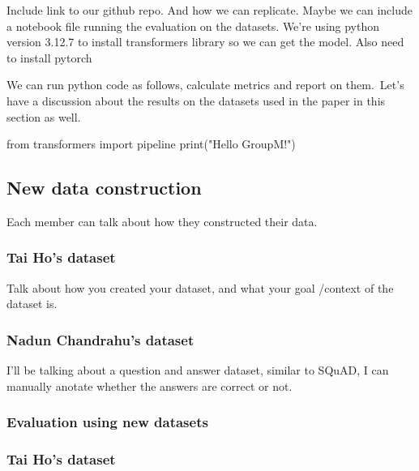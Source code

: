 \documentclass[
  11pt,
]{article}
\newenvironment{Shaded}{\begin{snugshade}}{\end{snugshade}}
\newcommand{\BuiltInTok}[1]{#1}
\newcommand{\ImportTok}[1]{#1}
\newcommand{\NormalTok}[1]{#1}
\newcommand{\StringTok}[1]{\textcolor[rgb]{0.31,0.60,0.02}{#1}}
\begin{document}
Include link to our github repo. And how we can replicate. Maybe we can
include a notebook file running the evaluation on the datasets. We're
using python version 3.12.7 to install transformers library so we can
get the model. Also need to install pytorch

We can run python code as follows, calculate metrics and report on
them.~Let's have a discussion about the results on the datasets used in
the paper in this section as well.

\begin{Shaded}
\begin{Highlighting}[]
\ImportTok{from}\NormalTok{ transformers }\ImportTok{import}\NormalTok{ pipeline}
\BuiltInTok{print}\NormalTok{(}\StringTok{"Hello GroupM!"}\NormalTok{)}
\end{Highlighting}
\end{Shaded}

\subsection{New data construction}\label{new-data-construction}

Each member can talk about how they constructed their data.

\subsubsection{Tai Ho's dataset}\label{tai-hos-dataset}

Talk about how you created your dataset, and what your goal /context of
the dataset is.

\subsubsection{Nadun Chandrahu's
dataset}\label{nadun-chandrahus-dataset}

I'll be talking about a question and answer dataset, similar to SQuAD, I
can manually anotate whether the answers are correct or not.

\subsubsection{Evaluation using new
datasets}\label{evaluation-using-new-datasets}

\subsubsection{Tai Ho's dataset}\label{tai-hos-dataset-1}
\end{document}
